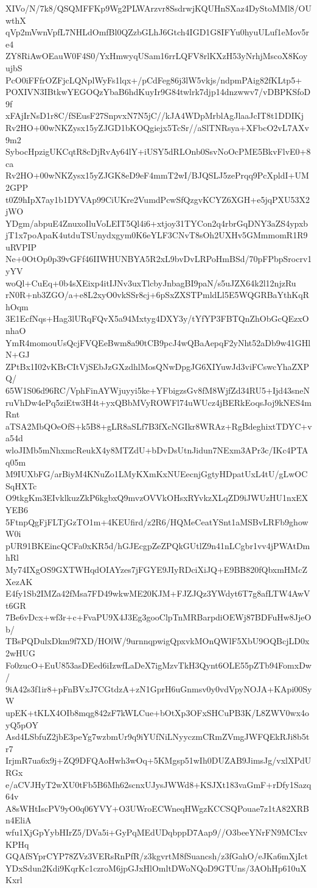 XIVo/N/7k8/QSQMFFKp9Wg2PLWArzvr8SsdrwjKQUHnSXaz4DyStoMMl8/OUwthX
qVp2mVwnVpfL7NHLdOmfBl0QZzbGLhJ6Gtch4IGD1G8IFYu0hyuULuf1eMov5re4
ZY8RiAwOEauW0F4S0/YxHmwyqUSam16rrLQFV8rlKXzH53yNrhjMscoX8KoyujbS
PcO0iFFfrOZFjcLQNplWyFs1lqx+/pCdFeg86j3lW5vkjs/ndpmPAig82fKLtp5+
POXIVN3IBtkwYEGOQzYbaB6hdKuyIr9G84twlrk7djp14dnzwwv7/vDBPKSfoD9f
xFAjIrNsD1r8C/fSEusF27SnpvxN7N5jC//kJA4WDpMrblAgJlaaJcIT8t1DDIKj
Rv2HO+00wNKZysx15yZJGD1bKOQgiejx5TcSr//aSlTNRsya+XFbcO2vL7AXv9m2
SybocHpzigUKCqtR8cDjRvAy64lY+iUSY5dRLOnb0SsvNoOcPME5BkvFlvE0+8ca
Rv2HO+00wNKZysx15yZJGK8eD9eF4mmT2wI/BJQSLJ5zePrqq9PcXpldI+UM2GPP
t0Z9hIpX7ay1b1DYVAp99CiUKre2VumdPcwSfQzgvKCYZ6XGH+e5jqPXU53X2jWO
YDgm/abpuE4ZnuxoIluVoLEIT5Ql4i6+xtjoy31TYCon2q4rbrGqDNY3aZS4ypxb
jT1x7poApaK4utduTSUnydxgym0K6eYLF3CNvT8sOh2UXHv5GMmmomR1R9uRVPIP
Ne+0OtOp0p39vGFf46IIWHUNBYA5R2xL9bvDvLRPoHmBSd/70pFPbpSrocrv1yYV
woQl+CuEq+0b4sXEixp4itIJNv3uxTlcbyJnbagBI9paN/s5uJZX64k2l12njzRu
rN0R+nb3ZGO/a+e8L2xyO0vkSSr8cj+6pSxZXSTPmldLl5E5WQGRBaYthKqRhOqm
3E1EcfNqs+Hag3lURqFQvX5a94Mxtyg4DXY3y/tYfYP3FBTQnZhObGcQEzxOnhaO
YmR4momouUsQcjFVQEeBwm8a90tCB9pcJ4wQBaAepqF2yNht52aDb9w41GHlN+GJ
ZPtBx1I02vKBrCItVjSEbJzGXzdhlMosQNwDpgJG6XIYuwJd3viFCswcYhaZXPQ/
65W1S06d96RC/VphFinAYWjuyyi5ke+YFbigzsGv8fM8WjfZd34RU5+Ijd43sneN
ruVhDw4ePq5ziEtw3H4t+yxQBbMVyROWFl74uWUcz4jBERkEoqsJoj9kNES4mRnt
aTSA2MbQOeOfS+k5B8+gLR8aSLf7B3fXcNGIkr8WRAz+RgBdeghixtTDYC+va54d
wloJIMb5mNhxmcReukX4y8MTZdU+bDvDsUtnJidun7NExm3APr3c/IKc4PTAq05m
M9IUXbFG/arBiyM4KNuZo1LMyKXmKxNUEecnjGgtyHDpatUxL4tU/gLwOCSqHXTc
O9tkgKm3EIvklkuzZkP6kgbxQ9mvzOVVkOHsxRYvkzXLqZD9iJWUzHU1nxEXYEB6
5FtnpQgFjFLTjGzTO1m+4KEUfird/z2R6/HQMeCeatYSnt1aMSBvLRFb9ghowW0i
pUR91BKEincQCFa0xKR5d/hGJEcgpZeZPQkGUtlZ9n41nLCgbr1vv4jPWAtDmhRl
My74IXgOS9GXTWHqdOIAYzes7jFGYE9JIyRDciXiJQ+E9BB820fQbxmHMcZXezAK
E4fy1Sb2IMZa42fMsa7FD49wkwME20KJM+FJZJQz3YWdyt6T7g8afLTW4AwVt6GR
7Be6vDcx+wf3r+c+FvaPU9X4J3Eg3gooClpTnMRBarpdiOEWj87BDFuHw8JjeOb/
TBsPQDulxDkm9f7XD/HOlW/9urnnqpwigQpxvkMOnQWlF5XbU9OQBcjLD0x2wHUG
Fo0zucO+EuU853asDEed6iIzwfLaDeX7igMzvTkH3Qynt6OLE55pZTb94FomxDw/
9iA42s3f1ir8+pFnBVxJ7CGtdzA+zN1GprH6uGnmsv0y0vdVpyNOJA+KApi00SyW
upEK+tKLX4OIb8mqg842zF7kWLCue+bOtXp3OFxSHCuPB3K/L8ZWV0wx4oyQ5pOY
Asd4LSbfuZ2jbE3peYg7wzbmUr9q9iYUfNiLNyyczmCRmZVmgJWFQEkRJi8b5tr7
IrjmR7ua6x9j+ZQ9DFQAoHwh3wOq+5KMgsp51wIh0DUZAB9JimsJg/vxlXPdURGx
e/aCVJHyT2wXU0tFb5B6Mh62scnxUJysJWWd8+KSJXt183vaGmF+rDfy1Sazq64v
A8sWHtIscPV9yO0q06YVY+O3UWroECWneqHWgzKCCSQPouae7z1tA82XRBn4EliA
wfu1XjGpYybHIrZ5/DVa5i+GyPqMEdUDqbppD7Aap9//O3beeYNrFN9MCIxvKPHq
GQAfSYprCYP78ZVz3VERsRnPfR/z3kgvrtM8fSuancsh/z3fGahO/eJKa6mXjIct
YDxSdun2Kdi9KqrKc1czroM6jpGJxHlOmltDWoNQoD9GTUns/3AOhHp610uXKxrl
